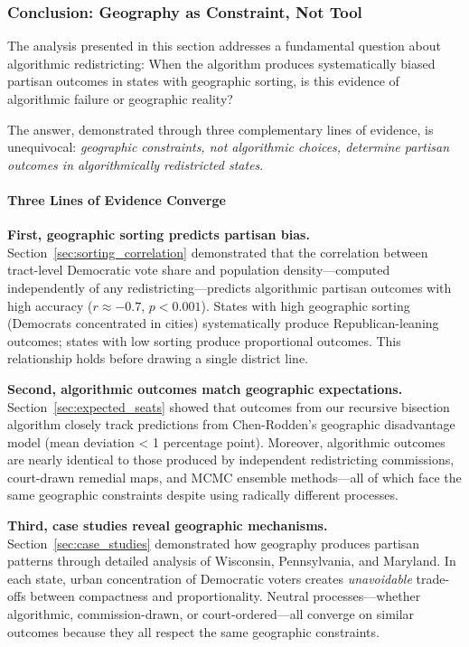
\subsubsection{Conclusion: Geography as Constraint, Not Tool}
\label{sec:geographic_conclusion}

The analysis presented in this section addresses a fundamental question about algorithmic redistricting: When the algorithm produces systematically biased partisan outcomes in states with geographic sorting, is this evidence of algorithmic failure or geographic reality?

The answer, demonstrated through three complementary lines of evidence, is unequivocal: \textit{geographic constraints, not algorithmic choices, determine partisan outcomes in algorithmically redistricted states}.

\paragraph{Three Lines of Evidence Converge}

\textbf{First, geographic sorting predicts partisan bias.} Section~\ref{sec:sorting_correlation} demonstrated that the correlation between tract-level Democratic vote share and population density---computed independently of any redistricting---predicts algorithmic partisan outcomes with high accuracy ($r \approx -0.7$, $p < 0.001$). States with high geographic sorting (Democrats concentrated in cities) systematically produce Republican-leaning outcomes; states with low sorting produce proportional outcomes. This relationship holds before drawing a single district line.

\textbf{Second, algorithmic outcomes match geographic expectations.} Section~\ref{sec:expected_seats} showed that outcomes from our recursive bisection algorithm closely track predictions from Chen-Rodden's geographic disadvantage model (mean deviation < 1 percentage point). Moreover, algorithmic outcomes are nearly identical to those produced by independent redistricting commissions, court-drawn remedial maps, and MCMC ensemble methods---all of which face the same geographic constraints despite using radically different processes.

\textbf{Third, case studies reveal geographic mechanisms.} Section~\ref{sec:case_studies} demonstrated how geography produces partisan patterns through detailed analysis of Wisconsin, Pennsylvania, and Maryland. In each state, urban concentration of Democratic voters creates \textit{unavoidable} trade-offs between compactness and proportionality. Neutral processes---whether algorithmic, commission-drawn, or court-ordered---all converge on similar outcomes because they all respect the same geographic constraints.

